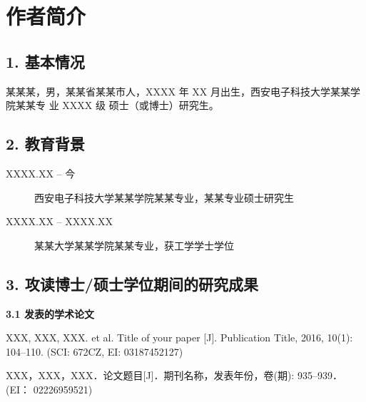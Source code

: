 
\chapter*{作者简介}
\label{chap:author}

\section*{\textbf{\normalsize 1. 基本情况}}

某某某，男，某某省某某市人，XXXX 年 XX 月出生，西安电子科技大学某某学院某某专
业 XXXX 级 硕士（或博士）研究生。

\section*{\textbf{\normalsize 2. 教育背景}}

\begin{description}
  \item[XXXX.XX -- 今] 西安电子科技大学某某学院某某专业，某某专业硕士研究生
  \item[XXXX.XX -- XXXX.XX] 某某大学某某学院某某专业，获工学学士学位
\end{description}

\section*{\textbf{\normalsize 3. 攻读博士/硕士学位期间的研究成果}}

\noindent\textbf{\small 3.1 发表的学术论文}

\begin{enumerate}[{[}1{]}] \wuhao
\item XXX, XXX, XXX. et al. Title of your paper [J]. Publication Title, 2016,
  10(1): 104--110. (SCI: 672CZ, EI: 03187452127)
\item XXX，XXX，XXX．论文题目[J]．期刊名称，发表年份，卷(期): 935--939．(EI：
  02226959521)
\end{enumerate}

